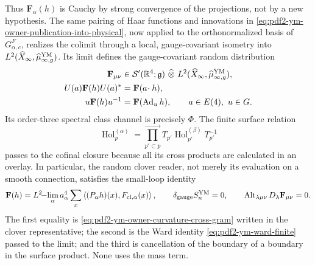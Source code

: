 Thus $\mathbf F_\alpha(h)$ is Cauchy by strong convergence of the projections,
not by a new hypothesis. The same pairing of Haar functions and innovations in
\eqref{eq:pdf2-ym-owner-publication-into-physical}, now applied to the
orthonormalized basis of $G_{\alpha,c}^{F}$, realizes the colimit through a local,
gauge-covariant isometry into
$L^2(\widehat X_\infty,\widehat\mu_{\infty,g}^{\rm YM})$. Its limit defines the
gauge-covariant random distribution
\begin{equation}\label{eq:pdf2-ym-owner-distributional-curvature}
\begin{aligned}
 \mathbf F_{\mu\nu}&\in
 \mathcal S'(\mathbb R^4;\mathfrak g)\ \widehat\otimes\
 L^2(\widehat X_\infty,\widehat\mu_{\infty,g}^{\rm YM}),\\
 U(a)\mathbf F(h)U(a)^*&=\mathbf F(a\!\cdot h),\\
 u\mathbf F(h)u^{-1}&=\mathbf F(\operatorname{Ad}_u h),
 \qquad a\in E(4),\ u\in G.
\end{aligned}
\end{equation}
Its order-three spectral class channel is precisely $\Phi$. The finite surface
relation
\begin{equation}\label{eq:pdf2-ym-owner-surface-product}
 \operatorname{Hol}^{(\alpha)}_p
 =\prod_{p'\subset p}^{\longrightarrow}
  T_{p'}\operatorname{Hol}^{(\beta)}_{p'}T_{p'}^{-1}
\end{equation}
passes to the cofinal closure because all its cross products are calculated in an
overlay. In particular, the random clover reader, not merely its evaluation on a
smooth connection, satisfies the small-loop identity
\begin{equation}\label{eq:pdf2-ym-owner-holonomy-curvature-relation}
 \mathbf F(h)=L^2\!\mathord{-}\!\lim_{\alpha}
 a_\alpha^4\sum_x
 \left\langle(P_\alpha h)(x),F_{{\rm cl},\alpha}(x)\right\rangle,
 \qquad
 \delta_{\rm gauge}S_n^{\rm YM}=0,
 \qquad
 \operatorname{Alt}_{\lambda\mu\nu}D_\lambda\mathbf F_{\mu\nu}=0.
\end{equation}
The first equality is \eqref{eq:pdf2-ym-owner-curvature-cross-gram} written in the
clover representative; the second is the Ward identity
\eqref{eq:pdf2-ym-ward-finite} passed to the limit; and the
third is cancellation of the boundary of a boundary in the surface product.
None uses the mass term.


